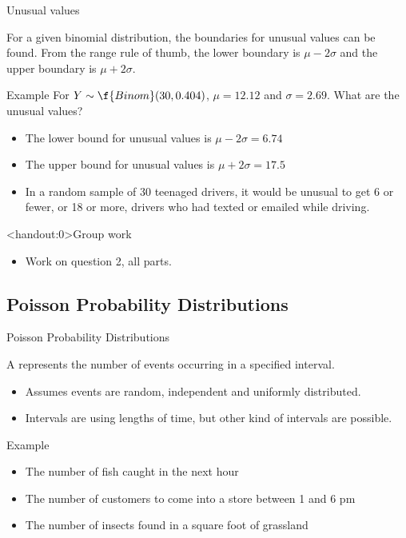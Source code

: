\documentclass[xcolor=table, handout]{beamer}
\begin{document}
\begin{frame}{Unusual values}
\begin{block}{}
For a given binomial distribution, the boundaries for unusual values can be found. From the range rule of thumb, the lower boundary is $\mu - 2 \sigma$ and the upper boundary is $\mu + 2\sigma$.
\end{block}
\pause
\begin{exampleblock}{Example}
For $Y \sim \f{Binom}(30, 0.404)$, $\mu = 12.12$ and $\sigma = 2.69$. What are the unusual values?
\begin{itemize}
\pause\item The lower bound for unusual values is $\mu - 2 \sigma = 6.74$
\pause\item The upper bound for unusual values is $\mu + 2 \sigma = 17.5$
\pause\item In a random sample of 30 teenaged drivers, it would be unusual to get 6 or fewer, or 18 or more, drivers who had texted or emailed while driving.
\end{itemize}
\end{exampleblock}
\end{frame}

\begin{frame}<handout:0>{Group work}
\begin{block}{}
\large
\begin{itemize}
\item Work on question 2, all parts.
\end{itemize}
\end{block}
\end{frame}


\subsection{Poisson Probability Distributions}

\begin{frame}{Poisson Probability Distributions}
\begin{block}{}
{\large A  represents the number of events occurring in a specified interval.} 
\begin{itemize}
\pause\item Assumes events are random, independent and uniformly distributed.
\pause\item Intervals are using lengths of time, but other kind of intervals are possible.
\end{itemize}
\end{block}
\pause
\begin{exampleblock}{Example}
\begin{itemize}
\item The number of fish caught in the next hour
\item The number of customers to come into a store between 1 and 6 pm
\item The number of insects found in a square foot of grassland
\end{itemize}
\end{exampleblock}
\end{frame}
\end{document}
